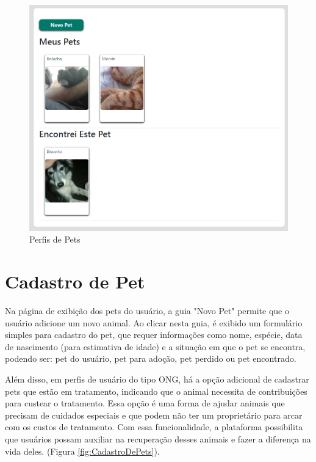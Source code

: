 \begin{figure}[htb]
     \centering
     \includegraphics[width=14cm]{arquivos/Figuras/image13.png}
     \caption{Perfis de Pets}
     \label{fig:PerfisDePets}
\end{figure}

\newpage
\section{Cadastro de Pet}
Na página de exibição dos pets do usuário, a guia "Novo Pet" permite que o usuário adicione um novo animal. Ao clicar nesta guia, é exibido um formulário simples para cadastro do pet, que requer informações como nome, espécie, data de nascimento (para estimativa de idade) e a situação em que o pet se encontra, podendo ser: pet do usuário, pet para adoção, pet perdido ou pet encontrado.

Além disso, em perfis de usuário do tipo ONG, há a opção adicional de cadastrar pets que estão em tratamento, indicando que o animal necessita de contribuições para custear o tratamento. Essa opção é uma forma de ajudar animais que precisam de cuidados especiais e que podem não ter um proprietário para arcar com os custos de tratamento. Com essa funcionalidade, a plataforma possibilita que usuários possam auxiliar na recuperação desses animais e fazer a diferença na vida deles. (Figura \ref{fig:CadastroDePets}).

